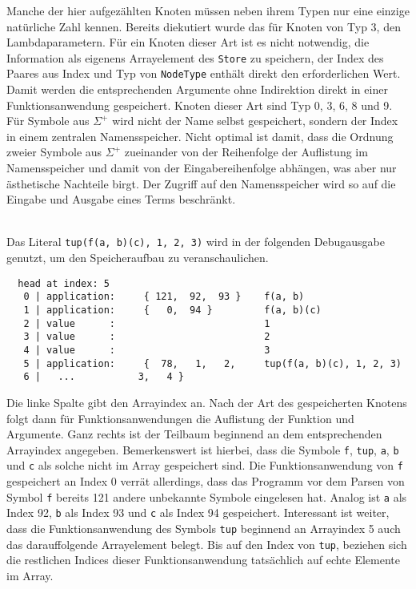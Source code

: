 Manche der hier aufgezählten Knoten müssen neben ihrem Typen nur eine einzige natürliche Zahl kennen. Bereits diekutiert wurde das für Knoten von Typ $3$, den Lambdaparametern. Für ein Knoten dieser Art ist es nicht notwendig, die Information als eigenens Arrayelement des \verb|Store| zu speichern, der Index des Paares aus Index und Typ von \verb|NodeType| enthält direkt den erforderlichen Wert. Damit werden die entsprechenden Argumente ohne Indirektion direkt in einer Funktionsanwendung gespeichert. Knoten dieser Art sind Typ 0, 3, 6, 8 und 9. Für Symbole aus $\Sigma^+$ wird nicht der Name selbst gespeichert, sondern der Index in einem zentralen Namensspeicher. Nicht optimal ist damit, dass die Ordnung zweier Symbole aus $\Sigma^+$ zueinander von der Reihenfolge der Auflistung im Namensspeicher und damit von der Eingabereihenfolge abhängen, was aber nur ästhetische Nachteile birgt. Der Zugriff auf den Namensspeicher wird so auf die Eingabe und Ausgabe eines Terms beschränkt.

\begin{beispiel}~\\ \label{bspREPLliteral}
Das Literal \verb|tup(f(a, b)(c), 1, 2, 3)| wird in der folgenden Debugausgabe genutzt, um den Speicheraufbau zu veranschaulichen.
\begin{verbatim}
  head at index: 5
   0 | application:     { 121,  92,  93 }    f(a, b)
   1 | application:     {   0,  94 }         f(a, b)(c)
   2 | value      :                          1
   3 | value      :                          2
   4 | value      :                          3
   5 | application:     {  78,   1,   2,     tup(f(a, b)(c), 1, 2, 3)
   6 |   ...           3,   4 }
\end{verbatim}
Die linke Spalte gibt den Arrayindex an. Nach der Art des gespeicherten Knotens folgt dann für Funktionsanwendungen die Auflistung der Funktion und Argumente. Ganz rechts ist der Teilbaum beginnend an dem entsprechenden Arrayindex angegeben. Bemerkenswert ist hierbei, dass die Symbole \verb|f|, \verb|tup|, \verb|a|, \verb|b| und \verb|c| als solche nicht im Array gespeichert sind. Die Funktionsanwendung von \verb|f| gespeichert an Index 0 verrät allerdings, dass das Programm vor dem Parsen von Symbol \verb|f| bereits 121 andere unbekannte Symbole eingelesen hat. Analog ist \verb|a| als Index 92, \verb|b| als Index 93 und \verb|c| als Index 94 gespeichert. 
Interessant ist weiter, dass die Funktionsanwendung des Symbols \verb|tup| beginnend an Arrayindex 5 auch das darauffolgende Arrayelement belegt. Bis auf den Index von \verb|tup|, beziehen sich die restlichen Indices dieser Funktionsanwendung tatsächlich auf echte Elemente im Array. 
\end{beispiel}


